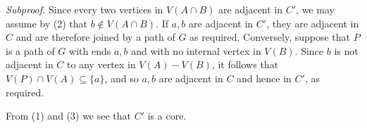 \textit{Subproof.} Since every two vertices in $V(A \cap B)$ are adjacent in $C'$, we may assume by (2) that $b \notin V(A \cap B)$. If $a, b$ are adjacent in $C'$, they are adjacent in $C$ and are therefore joined by a path of $G$ as required. Conversely, suppose that $P$ is a path of $G$ with ends $a, b$ and with no internal vertex in $V(B)$. Since $b$ is not adjacent in $C$ to any vertex in $V(A) - V(B)$, it follows that $V(P) \cap V(A) \subseteq \{a\}$, and so $a, b$ are adjacent in $C$ and hence in $C'$, as required.

From (1) and (3) we see that $C'$ is a core.

